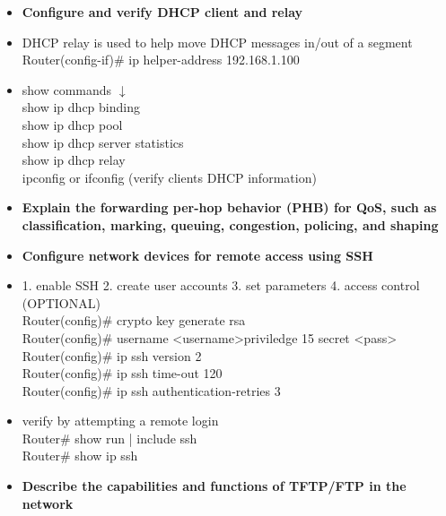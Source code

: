 \documentclass{article}
\begin{document}
\begin{itemize}
  \item \textbf{Configure and verify DHCP client and relay}
  	\item[] DHCP relay is used to help move DHCP messages in/out of a segment\\
		Router(config-if)\# ip helper-address 192.168.1.100
	\item[] show commands $\downarrow$\\
		show ip dhcp binding\\
		show ip dhcp pool\\
		show ip dhcp server statistics\\
		show ip dhcp relay\\
		ipconfig or ifconfig (verify clients DHCP information)
  \item \textbf{Explain the forwarding per-hop behavior (PHB) for QoS, such as classification, marking, queuing, congestion, policing, and shaping}
  \item \textbf{Configure network devices for remote access using SSH}
  	\item[] 1. enable SSH 2. create user accounts 3. set parameters 4. access control (OPTIONAL)\\
		Router(config)\# crypto key generate rsa\\
		Router(config)\# username \textless username\textgreater priviledge 15 secret \textless pass\textgreater\\
		Router(config)\# ip ssh version 2\\
		Router(config)\# ip ssh time-out 120\\
		Router(config)\# ip ssh authentication-retries 3
	\item[] verify by attempting a remote login\\
		Router\# show run | include ssh\\
		Router\# show ip ssh
  \item \textbf{Describe the capabilities and functions of TFTP/FTP in the network}
\end{itemize}
\end{document}
